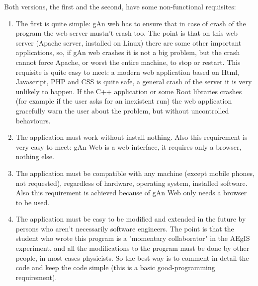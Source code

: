 Both versions, the first and the second, have some non-functional requisites:

\begin{enumerate}

\item The first is quite simple: gAn web has to ensure that in case of crash of the program the web server mustn't crash too. The point is that on this web server (Apache server, installed on Linux) there are some other important applications, so, if gAn web crashes it is not a big problem, but the crash cannot force Apache, or worst the entire machine, to stop or restart. 
This requisite is quite easy to meet: a modern web application based on Html, Javascript, PHP and CSS is quite safe, a general crash of the server it is very unlikely to happen. If the C++ application or some Root libraries crashes (for example if the user asks for an inexistent run) the web application gracefully warn the user about the problem, but without uncontrolled behaviours.  

\item The application must work without install nothing. Also this requirement is very easy to meet: gAn Web is a web interface, it requires only a browser, nothing else.

\item The application must be compatible with any machine (except mobile phones, not requested), regardless of hardware, operating system, installed software. Also this requirement is achieved because of gAn Web only needs a browser to be used. 

\item The application must be easy to be modified and extended in the future by persons who aren't necessarily software engineers. The point is that the student who wrote this program is a "momentary collaborator" in the AEgIS experiment, and all the modifications to the program must be done by other people, in most cases physicists. So the best way is to comment in detail the code and keep the code simple (this is a basic good-programming requirement).   


\end{enumerate}

